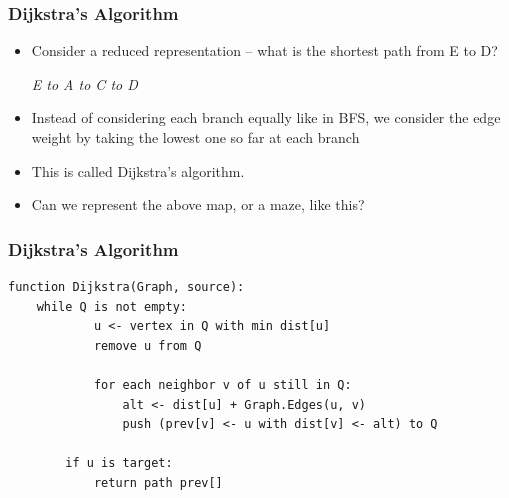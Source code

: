 \documentclass{beamer}
\begin{document}
\begin{frame}[fragile]
    \frametitle{Dijkstra's Algorithm}

\begin{itemize}
    \item 
    Consider a reduced representation -- what is the shortest path from E to D?

    \textit{E to A to C to D}

      
   \item Instead of considering each branch equally like in BFS, we consider the edge weight by taking the lowest one so far at each branch
\item  This is called Dijkstra's algorithm.

\item    Can we represent the above map, or a maze, like this?
\end{itemize}


\end{frame}


\begin{frame}[fragile]
    \frametitle{Dijkstra's Algorithm}



\begin{lstlisting}
function Dijkstra(Graph, source):
    while Q is not empty:
            u <- vertex in Q with min dist[u]
            remove u from Q
            
            for each neighbor v of u still in Q:
                alt <- dist[u] + Graph.Edges(u, v)
                push (prev[v] <- u with dist[v] <- alt) to Q

        if u is target:
            return path prev[]
   
\end{lstlisting}

\end{frame}
\end{document}
